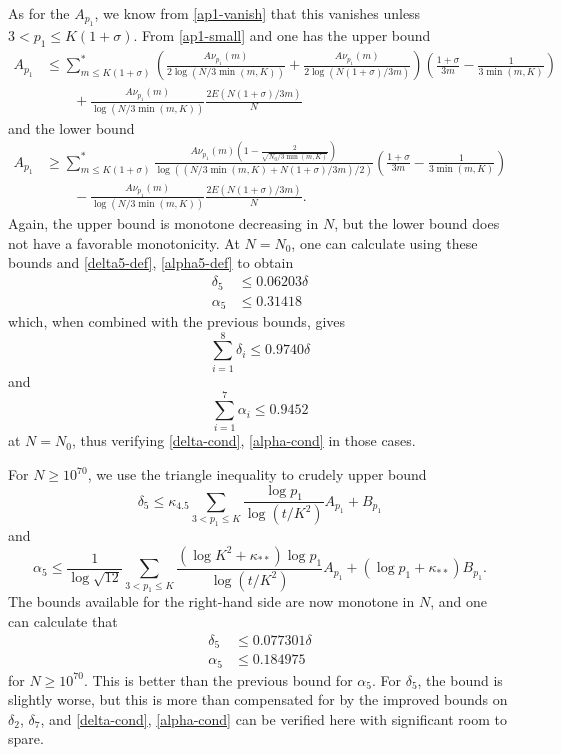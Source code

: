 \documentclass[12pt,a4paper,reqno]{amsart}
\numberwithin{equation}{section}
\theoremstyle{plain}
\theoremstyle{definition}
\begin{document}
As for the $A_{p_1}$, we know from \eqref{ap1-vanish} that this vanishes unless $3 < p_1 \leq K(1+\sigma)$.  From \eqref{ap1-small} and  one has the upper bound
\begin{align*}
A_{p_1} &\leq \sum_{m \leq K(1+\sigma)}^* \left(\frac{A \nu_{p_1}(m)}{2\log(N/3\min(m,K))} + \frac{A \nu_{p_1}(m)}{2\log(N(1+\sigma)/3m)} \right) \left( \frac{1+\sigma}{3m} - \frac{1}{3\min(m,K)}\right) \\
& \quad \quad + \frac{A \nu_{p_1}(m)}{\log(N/3\min(m,K))} \frac{2E(N(1+\sigma)/3m)}{N}  
\end{align*}
and the lower bound
\begin{align*}
A_{p_1} &\geq \sum_{m \leq K(1+\sigma)}^* \frac{A \nu_{p_1}(m)\left(1-\frac{2}{\sqrt{N_0/3\min(m,K)}}\right) }{\log((N/3\min(m,K) + N(1+\sigma)/3m)/2)} \left(\frac{1+\sigma}{3m} - \frac{1}{3\min(m,K)}\right) \\
& \quad \quad - \frac{A \nu_{p_1}(m)}{\log(N/3\min(m,K))}  \frac{2E(N(1+\sigma)/3m)}{N}.
\end{align*}
Again, the upper bound is monotone decreasing in $N$, but the lower bound does not have a favorable monotonicity. At $N=N_0$, one can calculate using these bounds and \eqref{delta5-def}, \eqref{alpha5-def} to obtain
\begin{align*}
\delta_5 &\leq 0.06203 \delta \\
\alpha_5 &\leq 0.31418
\end{align*}
which, when combined with the previous bounds, gives
$$ \sum_{i=1}^8 \delta_i  \leq 0.9740 \delta$$
and 
$$ \sum_{i=1}^7 \alpha_i \leq 0.9452$$
at $N=N_0$, thus verifying \eqref{delta-cond}, \eqref{alpha-cond} in those cases.

For $N \geq 10^{70}$, we use the triangle inequality to crudely upper bound
$$ \delta_5 \leq \kappa_{4.5} \sum_{3 < p_1 \leq K} \frac{\log p_1}{\log(t/K^2)} A_{p_1} + B_{p_1}$$
and
$$ \alpha_5 \leq \frac{1}{\log \sqrt{12}} \sum_{3 < p_1 \leq K}  \frac{(\log K^2+\kappa_{**})\log p_1}{\log(t/K^2)} A_{p_1} + (\log p_1 + \kappa_{**}) B_{p_1}.$$
The bounds available for the right-hand side are now monotone in $N$, and one can calculate that
\begin{align*}
  \delta_5 &\leq 0.077301 \delta \\
  \alpha_5 &\leq 0.184975
  \end{align*}
for $N \geq 10^{70}$. This is better than the previous bound for $\alpha_5$.  For $\delta_5$, the bound is slightly worse, but this is more than compensated for by the improved bounds on $\delta_2$, $\delta_7$, and \eqref{delta-cond}, \eqref{alpha-cond} can be verified here with significant room to spare.
\end{document}
